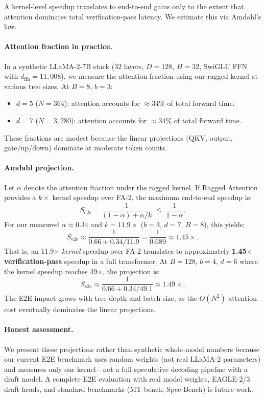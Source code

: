 \documentclass{article}
\newcommand{\method}{Ragged Attention}
\newcommand{\depth}{d}
\newcommand{\branching}{b}
\newcommand{\headdim}{D}
\newcommand{\batchsize}{B}
\begin{document}
A kernel-level speedup translates to end-to-end gains only to the
extent that attention dominates total verification-pass latency.
We estimate this via Amdahl's law.

\paragraph{Attention fraction in practice.}
In a synthetic LLaMA-2-7B stack (32 layers, $\headdim = 128$,
$H = 32$, SwiGLU FFN with $d_{\text{ffn}} = 11{,}008$), we measure
the attention fraction using our ragged kernel at various tree sizes.
At $\batchsize = 8$, $\branching = 3$:
\begin{itemize}[leftmargin=*,itemsep=2pt]
  \item $\depth = 5$ ($N = 364$): attention accounts for
    $\approx 34\%$ of total forward time.
  \item $\depth = 7$ ($N = 3{,}280$): attention accounts for
    $\approx 34\%$ of total forward time.
\end{itemize}
These fractions are modest because the linear projections
(QKV, output, gate/up/down) dominate at moderate token counts.

\paragraph{Amdahl projection.}
Let $\alpha$ denote the attention fraction under the ragged kernel.
If \method{} provides a $k\times$ kernel speedup over FA-2,
the maximum end-to-end speedup is:
\begin{equation}\label{eq:amdahl}
  S_{\text{e2e}} = \frac{1}{(1 - \alpha) + \alpha / k}
  \;\leq\; \frac{1}{1 - \alpha}.
\end{equation}
For our measured $\alpha \approx 0.34$ and $k = 11.9\times$
($\branching = 3$, $\depth = 7$, $\batchsize = 8$), this yields:
\[
  S_{\text{e2e}} \approx \frac{1}{0.66 + 0.34/11.9}
  = \frac{1}{0.689}
  \approx 1.45\times.
\]
That is, an 11.9$\times$ \emph{kernel} speedup over FA-2 translates
to approximately \textbf{1.45$\times$ verification-pass} speedup in a
full transformer.
At $\batchsize = 128$, $\branching = 4$, $\depth = 6$ where the
kernel speedup reaches 49$\times$, the projection is:
\[
  S_{\text{e2e}} \approx \frac{1}{0.66 + 0.34/49.1}
  \approx 1.49\times.
\]
The E2E impact grows with tree depth and batch size, as the $O(N^2)$
attention cost eventually dominates the linear projections.

\paragraph{Honest assessment.}
We present these projections rather than synthetic whole-model numbers
because our current E2E benchmark uses random weights (not real
LLaMA-2 parameters) and measures only our kernel---not a full
speculative decoding pipeline with a draft model.
A complete E2E evaluation with real model weights, EAGLE-2/3 draft
heads, and standard benchmarks (MT-bench, Spec-Bench) is future work.
\end{document}
